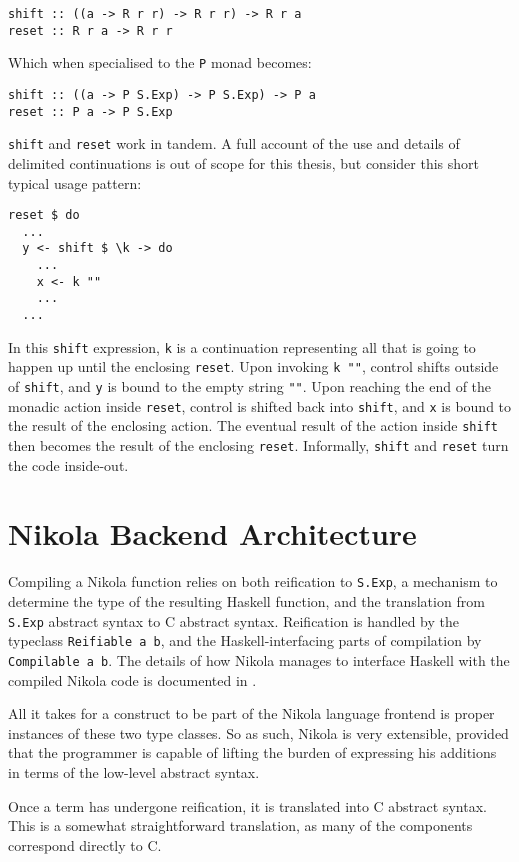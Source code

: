 \begin{verbatim}
shift :: ((a -> R r r) -> R r r) -> R r a
reset :: R r a -> R r r
\end{verbatim}

Which when specialised to the \texttt{P} monad becomes:

\begin{verbatim}
shift :: ((a -> P S.Exp) -> P S.Exp) -> P a
reset :: P a -> P S.Exp
\end{verbatim}

\texttt{shift} and \texttt{reset} work in tandem. A full account of the use and
details of delimited continuations is out of scope for this thesis, but
consider this short typical usage pattern:

\begin{verbatim}
reset $ do
  ...
  y <- shift $ \k -> do
    ...
    x <- k ""
    ...
  ...

\end{verbatim}

In this \texttt{shift} expression, \texttt{k} is a continuation representing
all that is going to happen up until the enclosing \texttt{reset}.  Upon
invoking \texttt{k ""}, control shifts outside of \texttt{shift}, and \texttt{y}
is bound to the empty string \texttt{""}. Upon reaching the end of the monadic
action inside \texttt{reset}, control is shifted back into \texttt{shift}, and
\texttt{x} is bound to the result of the enclosing action. The eventual result
of the action inside \texttt{shift} then becomes the result of the enclosing
\texttt{reset}. Informally, \texttt{shift} and \texttt{reset} turn the code
inside-out.

\section{Nikola Backend Architecture}

Compiling a Nikola function relies on both reification to \texttt{S.Exp}, a
mechanism to determine the type of the resulting Haskell function, and the
translation from \texttt{S.Exp} abstract syntax to C abstract syntax.
Reification is handled by the typeclass \texttt{Reifiable a b}, and the
Haskell-interfacing parts of compilation by \texttt{Compilable a b}.  The
details of how Nikola manages to interface Haskell with the compiled Nikola
code is documented in \cite{mainland2010nikola}.

All it takes for a construct to be part of the Nikola language frontend is
proper instances of these two type classes. So as such, Nikola is very
extensible, provided that the programmer is capable of lifting the burden of
expressing his additions in terms of the low-level abstract syntax.

Once a term has undergone reification, it is translated into C abstract syntax.
This is a somewhat straightforward translation, as many of the components
correspond directly to C.
